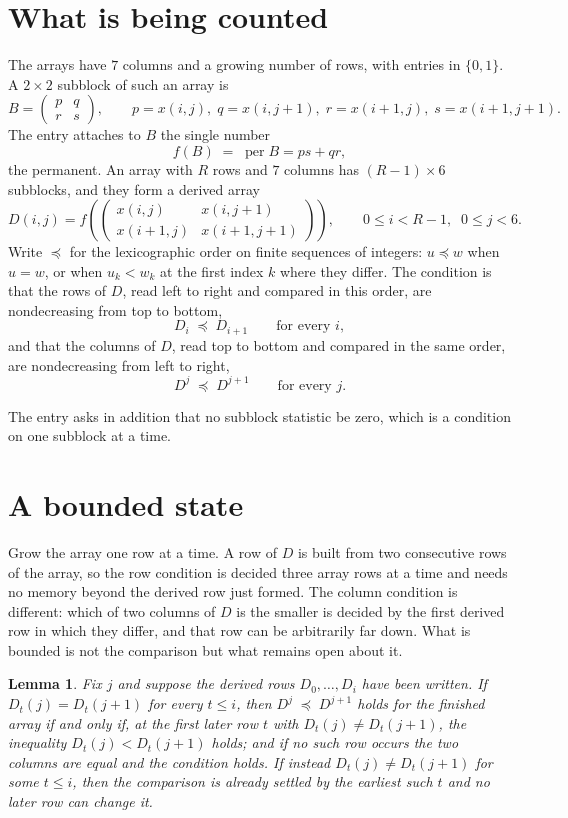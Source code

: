 \documentclass[11pt,a4paper]{article}
\theoremstyle{plain}
\newtheorem{lemma}[theorem]{Lemma}
\theoremstyle{definition}
\begin{document}
\section{What is being counted}

The arrays have $7$ columns and a growing number of rows, with entries in $\{0,1\}$. A
$2\times2$ subblock of such an array is
\[
B=\begin{pmatrix} p & q \\ r & s \end{pmatrix},
\qquad p=x(i,j),\; q=x(i,j+1),\; r=x(i+1,j),\; s=x(i+1,j+1).
\]
The entry attaches to $B$ the single number
\[
f(B)\;=\;\operatorname{per}B=ps+qr,
\]
the permanent. An array with $R$ rows and $7$ columns has $(R-1)\times6$ subblocks, and they
form a derived array
\[
D(i,j)=f\!\left(\begin{pmatrix} x(i,j) & x(i,j+1) \\ x(i+1,j) & x(i+1,j+1)\end{pmatrix}
\right),\qquad 0\le i<R-1,\;\; 0\le j<6 .
\]
Write $\preceq$ for the lexicographic order on finite sequences of integers: $u\preceq w$ when
$u=w$, or when $u_k<w_k$ at the first index $k$ where they differ. The condition is that the
rows of $D$, read left to right and compared in this order, are nondecreasing from top to bottom,
\[
D_{i}\;\preceq\;D_{i+1}\qquad\text{for every } i,
\]
and that the columns of $D$, read top to bottom and compared in the same order, are nondecreasing
from left to right,
\[
D^{j}\;\preceq\;D^{j+1}\qquad\text{for every } j .
\]

The entry asks in addition that no subblock statistic be zero, which is a condition on one subblock at a time.


\section{A bounded state}

Grow the array one row at a time. A row of $D$ is built from two consecutive rows of the array,
so the row condition is decided three array rows at a time and needs no memory beyond the
derived row just formed. The column condition is different: which of two columns of $D$ is the
smaller is decided by the first derived row in which they differ, and that row can be
arbitrarily far down. What is bounded is not the comparison but what remains open about it.

\begin{lemma}\label{lem:bits}
Fix $j$ and suppose the derived rows $D_0,\dots,D_i$ have been written. If $D_t(j)=D_t(j+1)$ for
every $t\le i$, then $D^{j}\;\preceq\;D^{j+1}$ holds for the finished array if and only if,
at the first later row $t$ with $D_t(j)\neq D_t(j+1)$, the inequality $D_t(j)<D_t(j+1)$
holds; and if no such row occurs the two columns are equal and the condition holds. If instead
$D_t(j)\neq D_t(j+1)$ for some $t\le i$, then the comparison is already settled by the earliest
such $t$ and no later row can change it.
\end{lemma}
\end{document}
